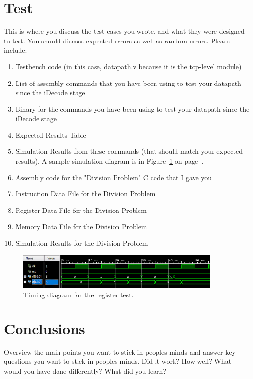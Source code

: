 \documentclass{article}
\newcommand{\Verilog}[3]{
  \lstset{language=Verilog}
  \lstset{backgroundcolor=\color{listinggray},rulecolor=\color{blue}}
  \lstset{linewidth=\textwidth}
  \lstset{commentstyle=\textit, stringstyle=\upshape,showspaces=false}
  \lstset{frame=tb}
  
}
\begin{document}
\section{Test}
This is where you discuss the test cases you wrote, and what they were designed to test.  You should discuss expected errors as well as random errors.  Please include:
\begin{enumerate}
	\item Testbench code (in this case, datapath.v because it is the top-level module)
	\item List of assembly commands that you have been using to test your datapath since the iDecode stage
	\item Binary for the commands you have been using to test your datapath since the iDecode stage
	\item Expected Results Table
	\item Simulation Results from these commands (that should match your expected results).  A sample simulation diagram is in Figure~\ref{fig:regtest} on page~\pageref{fig:regtest}.
	\item Assembly code for the "Division Problem" C code that I gave you
	\item Instruction Data File for the Division Problem
	\item Register Data File for the Division Problem
	\item Memory Data File for the Division Problem
	\item Simulation Results for the Division Problem
\end{enumerate}

\Verilog{Verilog code for testing a register.}{code:regtest}{../code/1_fetch/register_test.v}

\begin{figure}
\begin{center}
\caption{Timing diagram for the register test.}\label{fig:regtest}
\includegraphics[width=0.9\textwidth]{../images/registertiming.png}
\end{center}
\end{figure}

\section{Conclusions}
Overview the main points you want to stick in peoples minds and answer key questions you want to stick in peoples minds.  Did it work?  How well? What would you have done differently?  What did you learn?
\end{document}
